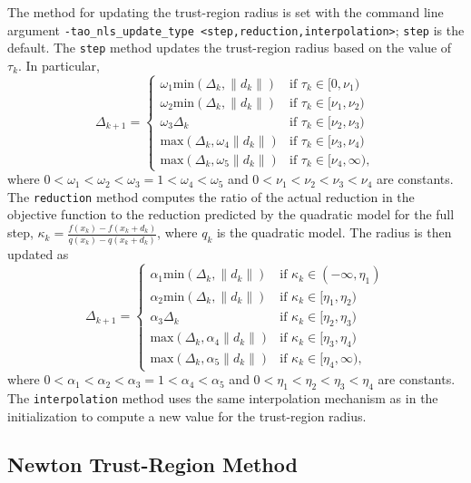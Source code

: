 The method for updating the trust-region radius is set with the 
command line argument 
{\tt -tao\_nls\_update\_type <step,reduction,interpolation>}; {\tt step} 
is the default.  The {\tt step} method updates the trust-region 
radius based on the value of $\tau_k$.  In particular,
\[
\Delta_{k+1} = \left\{\begin{array}{ll}
\omega_1 \mbox{min}(\Delta_k, \|d_k\|) & \mbox{if } \tau_k \in [0, \nu_1) \\
\omega_2 \mbox{min}(\Delta_k, \|d_k\|) & \mbox{if } \tau_k \in [\nu_1, \nu_2) \\
\omega_3 \Delta_k & \mbox{if } \tau_k \in [\nu_2, \nu_3) \\
\mbox{max}(\Delta_k, \omega_4 \|d_k\|) & \mbox{if } \tau_k \in [\nu_3, \nu_4) \\
\mbox{max}(\Delta_k, \omega_5 \|d_k\|) & \mbox{if } \tau_k \in [\nu_4, \infty),
\end{array}
\right.
\]
where $0 < \omega_1 < \omega_2 < \omega_3 = 1 < \omega_4 < \omega_5$ and
$0 < \nu_1 < \nu_2 < \nu_3 < \nu_4$ are constants.  The {\tt reduction} 
method computes the ratio of the actual reduction in the objective function 
to the reduction predicted by the quadratic model for the full step, 
$\kappa_k = \frac{f(x_k) - f(x_k + d_k)}{q(x_k) - q(x_k + d_k)}$, where 
$q_k$ is the quadratic model.  The radius is then updated as
\[
\Delta_{k+1} = \left\{\begin{array}{ll}
\alpha_1 \mbox{min}(\Delta_k, \|d_k\|) & \mbox{if } \kappa_k \in (-\infty, \eta_1) \\
\alpha_2 \mbox{min}(\Delta_k, \|d_k\|) & \mbox{if } \kappa_k \in [\eta_1, \eta_2) \\
\alpha_3 \Delta_k & \mbox{if } \kappa_k \in [\eta_2, \eta_3) \\
\mbox{max}(\Delta_k, \alpha_4 \|d_k\|) & \mbox{if } \kappa_k \in [\eta_3, \eta_4) \\
\mbox{max}(\Delta_k, \alpha_5 \|d_k\|) & \mbox{if } \kappa_k \in [\eta_4, \infty),
\end{array}
\right.
\]
where $0 < \alpha_1 < \alpha_2 < \alpha_3 = 1 < \alpha_4 < \alpha_5$ and
$0 < \eta_1 < \eta_2 < \eta_3 < \eta_4$ are constants.  The {\tt interpolation}
method uses the same interpolation mechanism as in the initialization to
compute a new value for the trust-region radius.

\subsection{Newton Trust-Region Method}

